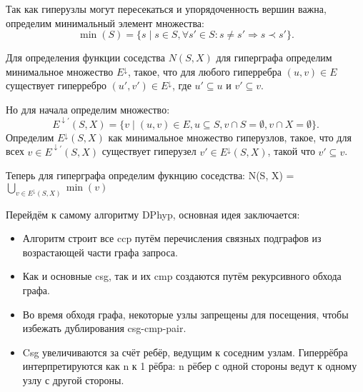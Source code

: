 \documentclass[12pt]{article}
\begin{document}
\begin{flushleft}
Так как гиперузлы могут пересекаться и упорядоченность вершин важна, определим минимальный элемент множества:
\[
\min(S) = \{s \mid s \in S, \forall s' \in S: s \neq s' \Rightarrow s \prec s'\}.
\]

Для определения функции соседства $N(S, X)$ для гиперграфа определим минимальное множество $E^\downarrow$, такое, что для любого гиперребра $(u, v) \in E$ существует гиперребро $(u', v') \in E^\downarrow$, где $u' \subseteq u$ и $v' \subseteq v$.

Но для начала определим множество:
\[
E^{\downarrow'}(S, X) = \{v \mid (u, v) \in E, u \subseteq S, v \cap S = \emptyset, v \cap X = \emptyset\}.
\]
Определим $E^\downarrow (S, X)$ как минимальное множество гиперузлов, такое, что для всех $v \in E^{\downarrow'}(S, X)$ существует гиперузел $v' \in E^\downarrow (S, X)$, такой что $v' \subseteq v$.

Теперь для гиперграфа определим фукнцию соседства:
N(S, X) = $\bigcup_{v \in E^\downarrow (S, X)} \min(v)$

Перейдём к самому алгоритму DPhyp, основная идея заключается:
\begin{itemize}
    \item Алгоритм строит все ccp путём перечисления связных подграфов из возрастающей части графа запроса.
    \item Как и основные csg, так и их cmp создаются путём рекурсивного обхода графа.
    \item Во время обходя графа, некоторые узлы запрещены для посещения, чтобы избежать дублирования csg-cmp-pair.
    \item Csg увеличиваются за счёт ребёр, ведущим к соседним узлам. 
    Гиперрёбра интерпретируются как n к 1 рёбра: n рёбер с одной стороны ведут к одному узлу с другой стороны.
\end{itemize}


\end{flushleft}
\end{document}
